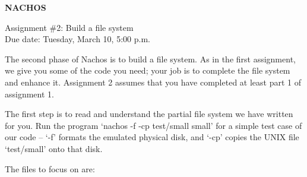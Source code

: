 


\begin{center}
{\large {\bf NACHOS}}



\vspace{.5in}
Assignment \#2: Build a file system\\
Due date: Tuesday, March 10, 5:00 p.m.
\end{center}

\vspace{.2in}

The second phase of Nachos is to build a file system.
As in the first assignment, we give you some of the code
you need; your job is to complete the file system and enhance it.
Assignment 2 assumes that you have completed at least part 1 of 
assignment 1.

The first step is to read and understand the partial file system
we have written for you.  
Run the program `nachos -f -cp test/small small' for a simple test case
of our code -- `-f' formats the emulated physical disk, and `-cp'
copies the UNIX file `test/small' onto that disk.

The files to focus on are:

